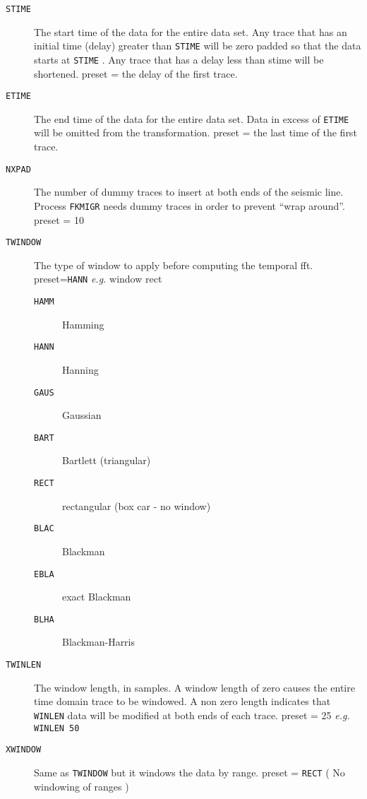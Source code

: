 \begin{description}
\item[\texttt{STIME}] The start time of the data for the entire data set.  Any trace
          that has an initial time (delay) greater than \texttt{STIME} will be zero
          padded so that the data starts at \texttt{STIME} .  Any trace that has a
          delay less than stime will be shortened.
          \Gls{preset} = the delay of the first trace.

\item[\texttt{ETIME}] The end time of the data for the entire data set. Data in excess
          of \texttt{ETIME} will be omitted from the transformation.
          \Gls{preset} = the last time of the first trace.

\item[\texttt{NXPAD}] The number of dummy traces to insert at both ends of the seismic
          line.  Process \texttt{FKMIGR} needs dummy traces in order to prevent
          ``wrap around''.
          \Gls{preset} = 10

\item[\texttt{TWINDOW}] The type of window to apply before computing the temporal \gls{fft}.
         \Gls{preset}=\texttt{HANN}  \textit{e.g.} window rect
\begin{description}
\item[\texttt{HAMM}] Hamming
\item[\texttt{HANN}] Hanning
\item[\texttt{GAUS}] Gaussian
\item[\texttt{BART}] Bartlett (triangular)
\item[\texttt{RECT}] rectangular (box car - no window)
\item[\texttt{BLAC}] Blackman
\item[\texttt{EBLA}] exact  Blackman
\item[\texttt{BLHA}] Blackman-Harris
\end{description}

\item[\texttt{TWINLEN}] The window length, in samples.  A window length of zero causes
          the entire time domain trace to be windowed.  A non zero length
          indicates that \texttt{WINLEN} data will be modified at both ends of
          each trace.
          \Gls{preset} = 25  \textit{e.g.} \texttt{WINLEN 50}

\item[\texttt{XWINDOW}] Same as \texttt{TWINDOW} but it windows the data by range.
          \Gls{preset} = \texttt{RECT} ( No windowing of ranges )


\end{description}
